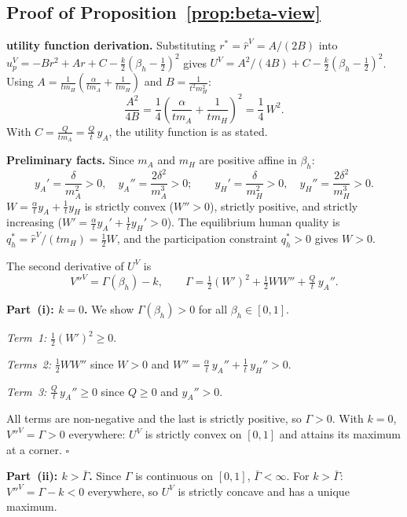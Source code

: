 \documentclass[mnsc,nonblindrev]{informs3_NoOR}
\begin{document}
\subsection*{Proof of Proposition~\ref{prop:beta-view}}
\noindent\textbf{utility function derivation.}
Substituting $r^* = \hat{r}^V = A/(2B)$ into $u_p^V = -Br^2 + Ar + C - \frac{k}{2}(\beta_h-\frac{1}{2})^2$ gives $U^V = A^2/(4B) + C - \frac{k}{2}(\beta_h-\frac{1}{2})^2$. Using $A = \frac{1}{tm_H}\!\left(\frac{\alpha}{tm_A}+\frac{1}{tm_H}\right)$ and $B = \frac{1}{t^2 m_H^2}$:
\[
\frac{A^2}{4B} = \frac{1}{4}\!\left(\frac{\alpha}{tm_A}+\frac{1}{tm_H}\right)^{\!2} = \frac{1}{4}\,W^2.
\]
With $C = \frac{Q}{tm_A} = \frac{Q}{t}\,y_A $, the utility function is as stated.
 
\medskip\noindent\textbf{Preliminary facts.}
Since $m_A$ and $m_H$ are positive affine in $\beta_h$:
\[
y_A' = \frac{\delta}{m_A^2}>0,\quad y_A'' = \frac{2\delta^2}{m_A^3}>0;\qquad y_H' = \frac{\delta}{m_H^2}>0,\quad y_H'' = \frac{2\delta^2}{m_H^3}>0.
\]
$W = \frac{\alpha}{t}y_A + \frac{1}{t}y_H $ is strictly convex ($W''>0$), strictly positive, and strictly increasing ($W' = \frac{\alpha}{t}y_A'+\frac{1}{t}y_H'>0$). The equilibrium human quality is $q_h^* = \hat{r}^V/(tm_H) = \frac{1}{2}W$, and the participation constraint $q_h^*>0$ gives $W>0$.
 
The second derivative of $U^V$ is
\[
V''^V = \Gamma(\beta_h) - k, \qquad \Gamma = \tfrac{1}{2}(W')^2 + \tfrac{1}{2}WW'' + \tfrac{Q}{t}\,y_A'' .
\]
 
\medskip\noindent\textbf{Part~(i): $k=0$.}
We show $\Gamma(\beta_h)>0$ for all $\beta_h \in [0,1]$.
 
\emph{Term~1:} $\frac{1}{2}(W')^2 \geq 0$.

\emph{Terms~2:} $\tfrac{1}{2}WW''$ since $W > 0$ and $W'' = \tfrac{\alpha}{t}\,y_A''+\tfrac{1}{t}\,y_H''>0$.
 
\emph{Term~3:} $\frac{Q}{t}\,y_A'' \geq 0$ since $Q \geq 0$ and $y_A''>0$.
 

All terms are non-negative and the last is strictly positive, so $\Gamma>0$. With $k=0$, $V''^V = \Gamma > 0$ everywhere: $U^V$ is strictly convex on $[0,1]$ and attains its maximum at a corner. \hfill$\square$
 
 
\medskip\noindent\textbf{Part~(ii): $k > \bar\Gamma$.}
Since $\Gamma$ is continuous on $[0,1]$, $\bar\Gamma<\infty$. For $k>\bar\Gamma$: $V''^V = \Gamma-k < 0$ everywhere, so $U^V$ is strictly concave and has a unique maximum.
 
\end{document}
